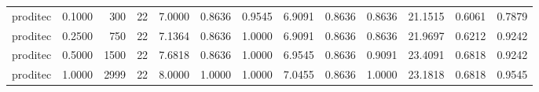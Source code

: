 \begin{tabular}{lrrrrrrrrrrrr}
proditec &    0.1000 &    300 &                22 &                           7.0000 &                          0.8636 &                       0.9545 &                      6.9091 &                     0.8636 &                  0.8636 &                  21.1515 &                  0.6061 &               0.7879 \\
proditec &    0.2500 &    750 &                22 &                           7.1364 &                          0.8636 &                       1.0000 &                      6.9091 &                     0.8636 &                  0.8636 &                  21.9697 &                  0.6212 &               0.9242 \\
proditec &    0.5000 &   1500 &                22 &                           7.6818 &                          0.8636 &                       1.0000 &                      6.9545 &                     0.8636 &                  0.9091 &                  23.4091 &                  0.6818 &               0.9242 \\
proditec &    1.0000 &   2999 &                22 &                           8.0000 &                          1.0000 &                       1.0000 &                      7.0455 &                     0.8636 &                  1.0000 &                  23.1818 &                  0.6818 &               0.9545 \\
\bottomrule
\end{tabular}
